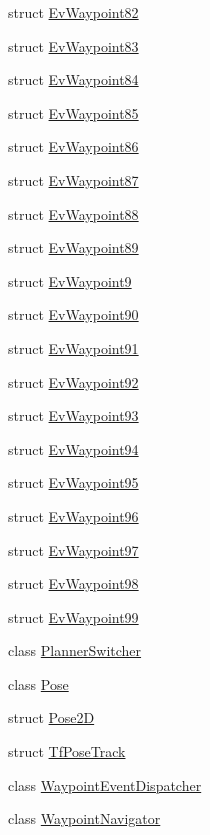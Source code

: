 \begin{DoxyCompactItemize}
struct \hyperlink{structcl__move__base__z_1_1EvWaypoint82}{Ev\+Waypoint82}
\item 
struct \hyperlink{structcl__move__base__z_1_1EvWaypoint83}{Ev\+Waypoint83}
\item 
struct \hyperlink{structcl__move__base__z_1_1EvWaypoint84}{Ev\+Waypoint84}
\item 
struct \hyperlink{structcl__move__base__z_1_1EvWaypoint85}{Ev\+Waypoint85}
\item 
struct \hyperlink{structcl__move__base__z_1_1EvWaypoint86}{Ev\+Waypoint86}
\item 
struct \hyperlink{structcl__move__base__z_1_1EvWaypoint87}{Ev\+Waypoint87}
\item 
struct \hyperlink{structcl__move__base__z_1_1EvWaypoint88}{Ev\+Waypoint88}
\item 
struct \hyperlink{structcl__move__base__z_1_1EvWaypoint89}{Ev\+Waypoint89}
\item 
struct \hyperlink{structcl__move__base__z_1_1EvWaypoint9}{Ev\+Waypoint9}
\item 
struct \hyperlink{structcl__move__base__z_1_1EvWaypoint90}{Ev\+Waypoint90}
\item 
struct \hyperlink{structcl__move__base__z_1_1EvWaypoint91}{Ev\+Waypoint91}
\item 
struct \hyperlink{structcl__move__base__z_1_1EvWaypoint92}{Ev\+Waypoint92}
\item 
struct \hyperlink{structcl__move__base__z_1_1EvWaypoint93}{Ev\+Waypoint93}
\item 
struct \hyperlink{structcl__move__base__z_1_1EvWaypoint94}{Ev\+Waypoint94}
\item 
struct \hyperlink{structcl__move__base__z_1_1EvWaypoint95}{Ev\+Waypoint95}
\item 
struct \hyperlink{structcl__move__base__z_1_1EvWaypoint96}{Ev\+Waypoint96}
\item 
struct \hyperlink{structcl__move__base__z_1_1EvWaypoint97}{Ev\+Waypoint97}
\item 
struct \hyperlink{structcl__move__base__z_1_1EvWaypoint98}{Ev\+Waypoint98}
\item 
struct \hyperlink{structcl__move__base__z_1_1EvWaypoint99}{Ev\+Waypoint99}
\item 
class \hyperlink{classcl__move__base__z_1_1PlannerSwitcher}{Planner\+Switcher}
\item 
class \hyperlink{classcl__move__base__z_1_1Pose}{Pose}
\item 
struct \hyperlink{structcl__move__base__z_1_1Pose2D}{Pose2D}
\item 
struct \hyperlink{structcl__move__base__z_1_1TfPoseTrack}{Tf\+Pose\+Track}
\item 
class \hyperlink{classcl__move__base__z_1_1WaypointEventDispatcher}{Waypoint\+Event\+Dispatcher}
\item 
class \hyperlink{classcl__move__base__z_1_1WaypointNavigator}{Waypoint\+Navigator}
\end{DoxyCompactItemize}
